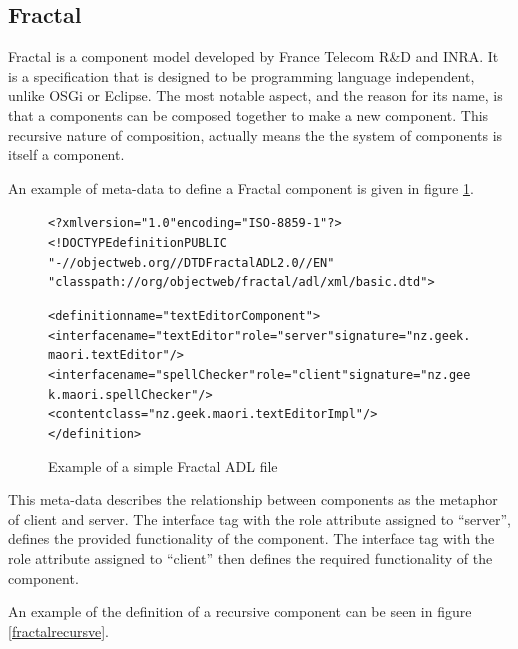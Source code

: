 \subsection{Fractal}
Fractal is a component model developed by France Telecom R\&D and INRA.
It is a specification that is designed to be programming language independent, unlike OSGi or Eclipse.
The most notable aspect, and the reason for its name, is that a components can be composed together to make a new component.
This recursive nature of composition, actually means the the system of components is itself a component.

An example of meta-data to define a Fractal component is given in figure \ref{fractalmetadata}.

\begin{figure}[htp]
\begin{center}
\begin{alltt}
<?xml version="1.0" encoding="ISO-8859-1" ?>
<!DOCTYPE definition PUBLIC 
    "-//objectweb.org//DTD Fractal ADL 2.0//EN" 
    "classpath://org/objectweb/fractal/adl/xml/basic.dtd">

<definition name="textEditorComponent">
  <interface name="textEditor" role="server" signature="nz.geek.maori.textEditor"/>
  <interface name="spellChecker" role="client" signature="nz.geek.maori.spellChecker"/>
  <content class="nz.geek.maori.textEditorImpl"/>
</definition>
\end{alltt}
  \caption[Fractal ADL Example]{Example of a simple Fractal ADL file}
  \label{fractalmetadata}
\end{center}
\end{figure}

This meta-data describes the relationship between components as the metaphor of client and server.
The interface tag with the role attribute assigned to ``server'', defines the provided functionality of the component.
The interface tag with the role attribute assigned to ``client'' then defines the required functionality of the component.  

An example of the definition of a recursive component can be seen in figure \ref{fractalrecursve}.

